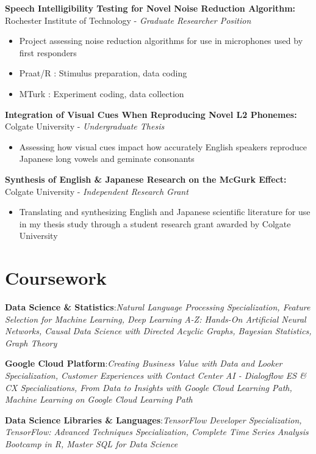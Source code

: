 \documentclass[a4paper,9pt]{extarticle}
\begin{document}
\noindent
\textbf{Speech Intelligibility Testing for Novel Noise Reduction Algorithm:}
Rochester Institute of Technology - \textit{Graduate Researcher Position}
\begin{itemize}

\item Project assessing noise reduction algorithms for use in microphones used by first responders
\item Praat/R : Stimulus preparation, data coding
\item MTurk : Experiment coding, data collection
\end{itemize}

\noindent
\textbf{Integration of Visual Cues When Reproducing Novel L2 Phonemes:}
Colgate University - \textit{Undergraduate Thesis}
\begin{itemize}

\item Assessing how visual cues impact how accurately English speakers reproduce Japanese long vowels and geminate consonants
\end{itemize}

\noindent
\textbf{Synthesis of English \& Japanese Research on the McGurk Effect:}
Colgate University - \textit{Independent Research Grant}
\begin{itemize}

\item Translating and synthesizing English and Japanese scientific literature for use in my thesis study through a student research grant awarded by Colgate University
\end{itemize}



\section*{Coursework}

\noindent
\textbf{Data Science \& Statistics}:\textit{Natural Language Processing Specialization, Feature Selection for Machine Learning, Deep Learning A-Z: Hands-On Artificial Neural Networks, Causal Data Science with Directed Acyclic Graphs, Bayesian Statistics, Graph Theory}

\noindent
\textbf{Google Cloud Platform}:\textit{Creating Business Value with Data and Looker Specialization, Customer Experiences with Contact Center AI - Dialogflow ES \& CX Specializations, From Data to Insights with Google Cloud Learning Path, Machine Learning on Google Cloud Learning Path}

\noindent
\textbf{Data Science Libraries \& Languages}:\textit{TensorFlow Developer Specialization, TensorFlow: Advanced Techniques Specialization, Complete Time Series Analysis Bootcamp in R, Master SQL for Data Science}
\end{document}
